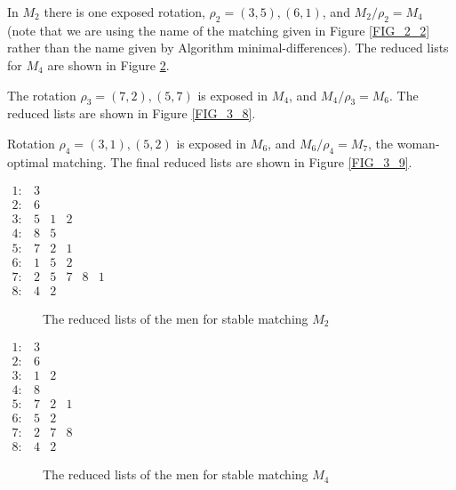 \begin{exmp}\label{exmp_3_9}
    In $M_2$ there is one exposed rotation, $\rho_2=(3,5),(6,1)$, and $M_2 / \rho_2=M_4$ (note that we are using the name of the matching given in Figure \ref{FIG_2_2} rather than the name given by Algorithm minimal-differences). The reduced lists for $M_4$ are shown in Figure \ref{FIG_3_7}.
\end{exmp}

\begin{exmp}\label{exmp_3_10}
    The rotation $\rho_3=(7,2),(5,7)$ is exposed in $M_4$, and $M_4 / \rho_3=M_6$. The reduced lists are shown in Figure \ref{FIG_3_8}.
\end{exmp}

\begin{exmp}\label{exmp_3_11}
    Rotation $\rho_4=(3,1),(5,2)$ is exposed in $M_6$, and $M_6 / \rho_4=M_7$, the woman-optimal matching. The final reduced lists are shown in Figure \ref{FIG_3_9}.
\end{exmp}



\begin{center}
    $\begin{array}{llllll}1: & 3 & & & & \\ 2: & 6 & & & & \\ 3: & 5 & 1 & 2 & & \\ 4: & 8 & 5 & & & \\ 5: & 7 & 2 & 1 & & \\ 6: & 1 & 5 & 2 & & \\ 7: & 2 & 5 & 7 & 8 & 1 \\ 8: & 4 & 2 & & & \end{array}$
    \begin{figure}[ht]
  \centering
  \caption{The reduced lists of the men for stable matching $M_2$}
  \label{FIG_3_6}
\end{figure}
\end{center}


\begin{center}
    $\begin{array}{llll}1: & 3 & & \\ 2: & 6 & & \\ 3: & 1 & 2 & \\ 4: & 8 & & \\ 5: & 7 & 2 & 1 \\ 6: & 5 & 2 & \\ 7: & 2 & 7 & 8 \\ 8: & 4 & 2 & \end{array}$
    \begin{figure}[ht]
  \centering
  \caption{The reduced lists of the men for stable matching $M_4$}
  \label{FIG_3_7}
\end{figure}
\end{center}

